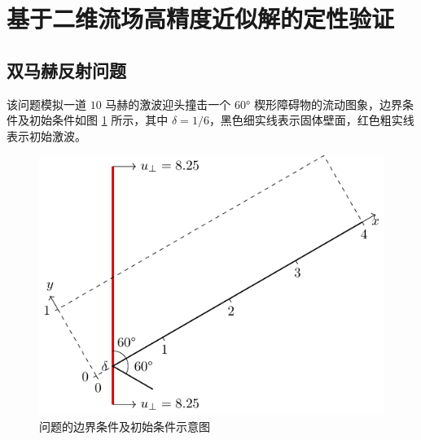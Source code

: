 \section{基于二维流场高精度近似解的定性验证}

\subsection{双马赫反射问题}

该问题模拟一道 $10$ 马赫的激波迎头撞击一个 $\ang{60}$ 楔形障碍物的流动图象，边界条件及初始条件如图 \ref{fig:double_mach_sketch}
所示，其中 $\delta=1/6$，黑色细实线表示固体壁面，红色粗实线表示初始激波。

\begin{figure}[h!]
\begin{centering}
\includegraphics[width=1\textheight,height=0.33\textheight,keepaspectratio]{figures/double_mach/sketch}
\par\end{centering}
\caption{\label{fig:double_mach_sketch}问题的边界条件及初始条件示意图}
\end{figure}

